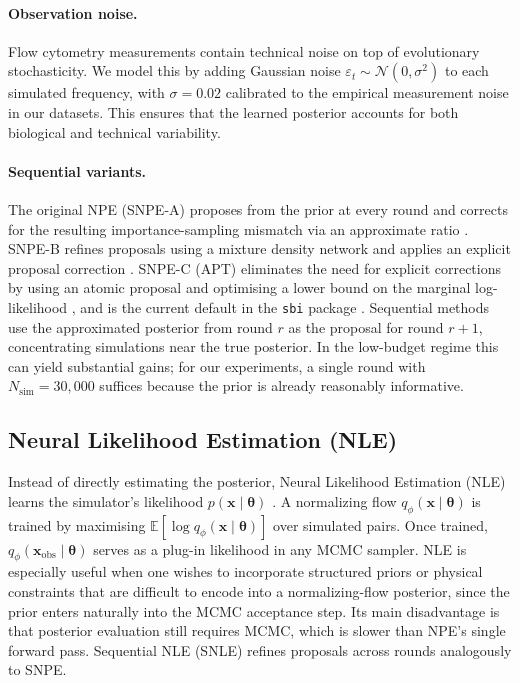\documentclass[11pt]{article}
\newcommand{\btheta}{\boldsymbol{\theta}}
\newcommand{\bx}{\mathbf{x}}
\newcommand{\E}{\mathbb{E}}
\begin{document}
\paragraph{Observation noise.}
Flow cytometry measurements contain technical noise on top of evolutionary
stochasticity.
We model this by adding Gaussian noise $\varepsilon_t\sim\mathcal{N}(0,
\sigma^2)$ to each simulated frequency, with $\sigma = 0.02$ calibrated to
the empirical measurement noise in our datasets.
This ensures that the learned posterior accounts for both biological and
technical variability.

\paragraph{Sequential variants.}
The original NPE (SNPE-A) proposes from the prior at every round and corrects
for the resulting importance-sampling mismatch via an approximate ratio
\citep{papamakarios2016fast}.
SNPE-B refines proposals using a mixture density network and applies an
explicit proposal correction \citep{lueckmann2017flexible}.
SNPE-C (APT) eliminates the need for explicit corrections by using an atomic
proposal and optimising a lower bound on the marginal log-likelihood
\citep{greenberg2019automatic}, and is the current default in the \texttt{sbi}
package \citep{tejero2020sbi}.
Sequential methods use the approximated posterior from round $r$ as the
proposal for round $r+1$, concentrating simulations near the true posterior.
In the low-budget regime this can yield substantial gains; for our
experiments, a single round with $N_\mathrm{sim}=30{,}000$ suffices because
the prior is already reasonably informative.

\subsection{Neural Likelihood Estimation (NLE)}
\label{sec:nle}

Instead of directly estimating the posterior, Neural Likelihood Estimation
(NLE) learns the simulator's likelihood $p(\bx\mid\btheta)$
\citep{papamakarios2019sequential}.
A normalizing flow $q_\phi(\bx\mid\btheta)$ is trained by maximising
$\E[\log q_\phi(\bx\mid\btheta)]$ over simulated pairs.
Once trained, $q_\phi(\bx_\mathrm{obs}\mid\btheta)$ serves as a
plug-in likelihood in any MCMC sampler.
NLE is especially useful when one wishes to incorporate structured priors
or physical constraints that are difficult to encode into a normalizing-flow
posterior, since the prior enters naturally into the MCMC acceptance step.
Its main disadvantage is that posterior evaluation still requires MCMC, which
is slower than NPE's single forward pass.
Sequential NLE (SNLE) refines proposals across rounds analogously to SNPE.
\end{document}
